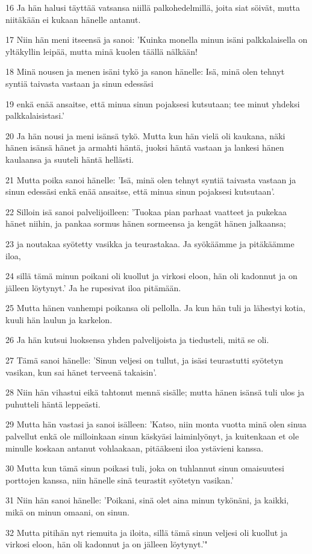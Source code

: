 \par 16 Ja hän halusi täyttää vatsansa niillä palkohedelmillä, joita siat söivät, mutta niitäkään ei kukaan hänelle antanut.
\par 17 Niin hän meni itseensä ja sanoi: 'Kuinka monella minun isäni palkkalaisella on yltäkyllin leipää, mutta minä kuolen täällä nälkään!
\par 18 Minä nousen ja menen isäni tykö ja sanon hänelle: Isä, minä olen tehnyt syntiä taivasta vastaan ja sinun edessäsi
\par 19 enkä enää ansaitse, että minua sinun pojaksesi kutsutaan; tee minut yhdeksi palkkalaisistasi.'
\par 20 Ja hän nousi ja meni isänsä tykö. Mutta kun hän vielä oli kaukana, näki hänen isänsä hänet ja armahti häntä, juoksi häntä vastaan ja lankesi hänen kaulaansa ja suuteli häntä hellästi.
\par 21 Mutta poika sanoi hänelle: 'Isä, minä olen tehnyt syntiä taivasta vastaan ja sinun edessäsi enkä enää ansaitse, että minua sinun pojaksesi kutsutaan'.
\par 22 Silloin isä sanoi palvelijoilleen: 'Tuokaa pian parhaat vaatteet ja pukekaa hänet niihin, ja pankaa sormus hänen sormeensa ja kengät hänen jalkaansa;
\par 23 ja noutakaa syötetty vasikka ja teurastakaa. Ja syökäämme ja pitäkäämme iloa,
\par 24 sillä tämä minun poikani oli kuollut ja virkosi eloon, hän oli kadonnut ja on jälleen löytynyt.' Ja he rupesivat iloa pitämään.
\par 25 Mutta hänen vanhempi poikansa oli pellolla. Ja kun hän tuli ja lähestyi kotia, kuuli hän laulun ja karkelon.
\par 26 Ja hän kutsui luoksensa yhden palvelijoista ja tiedusteli, mitä se oli.
\par 27 Tämä sanoi hänelle: 'Sinun veljesi on tullut, ja isäsi teurastutti syötetyn vasikan, kun sai hänet terveenä takaisin'.
\par 28 Niin hän vihastui eikä tahtonut mennä sisälle; mutta hänen isänsä tuli ulos ja puhutteli häntä leppeästi.
\par 29 Mutta hän vastasi ja sanoi isälleen: 'Katso, niin monta vuotta minä olen sinua palvellut enkä ole milloinkaan sinun käskyäsi laiminlyönyt, ja kuitenkaan et ole minulle koskaan antanut vohlaakaan, pitääkseni iloa ystävieni kanssa.
\par 30 Mutta kun tämä sinun poikasi tuli, joka on tuhlannut sinun omaisuutesi porttojen kanssa, niin hänelle sinä teurastit syötetyn vasikan.'
\par 31 Niin hän sanoi hänelle: 'Poikani, sinä olet aina minun tykönäni, ja kaikki, mikä on minun omaani, on sinun.
\par 32 Mutta pitihän nyt riemuita ja iloita, sillä tämä sinun veljesi oli kuollut ja virkosi eloon, hän oli kadonnut ja on jälleen löytynyt.'"


